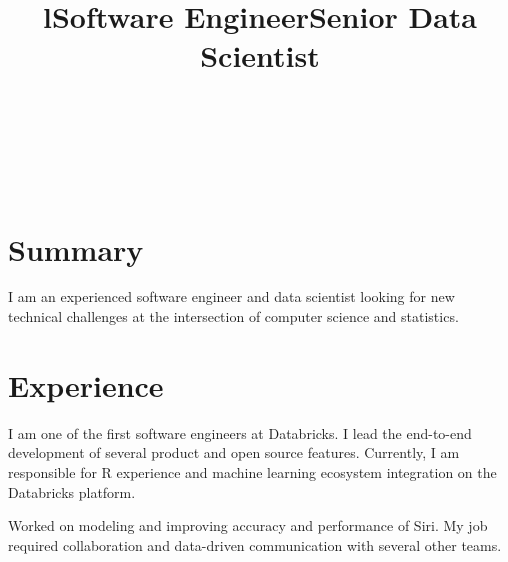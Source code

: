 \documentclass[margin]{res}
\begin{document}

\address{
1725 Liberty St., Apt 5\\
El Cerrito, CA 94530
}

\address{
Phone: 408-666-3793\\
Email: \href{mailto:falaki@gmail.com}{falaki@gmail.com}\\
Web: \href{http://www.falaki.net/}{www.falaki.net}
}


\begin{resume}

\begin{format}
\title{l}\\
\\
\body\\
\end{format}

\section{\sc \large Summary}
I am an experienced software engineer and data scientist looking for new technical challenges at the intersection of computer science and statistics.

\title{\bf Software Engineer}
\section{\sc \large Experience}
\begin{position}
I am one of the first software engineers at Databricks. I lead the end-to-end development of several product and open source features. Currently, I am responsible for R experience and machine learning ecosystem integration on the Databricks platform.
\end{position}

\vspace{-0.15cm}

\title{\bf Senior Data Scientist}
\begin{position}
Worked on modeling and improving accuracy and performance of Siri. My job required collaboration and data-driven communication with several other teams.
\end{position}

\vspace{-0.15cm}


\end{resume}
\end{document}
